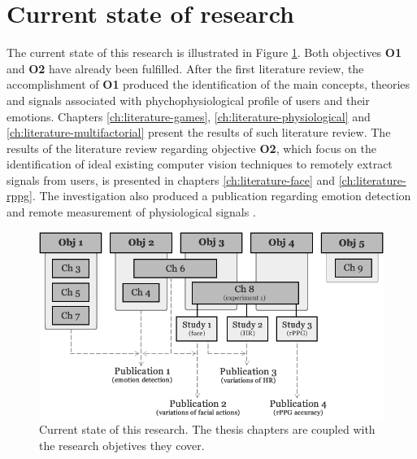 
\section{Current state of research}

The current state of this research is illustrated in Figure \ref{fig:research-current-state}. Both objectives \textbf{O1} and \textbf{O2} have already been fulfilled. After the first literature review, the accomplishment of \textbf{O1} produced the identification of the main concepts, theories and signals associated with phychophysiological profile of users and their emotions. Chapters \ref{ch:literature-games}, \ref{ch:literature-physiological} and \ref{ch:literature-multifactorial} present the results of such literature review. The results of the literature review regarding objective \textbf{O2}, which focus on the identification of ideal existing computer vision techniques to remotely extract signals from users, is presented in chapters \ref{ch:literature-face} and \ref{ch:literature-rppg}. The investigation also produced a publication regarding emotion detection and remote measurement of physiological signals \parencite{bevilacqua2015proposal}.

\begin{figure}[ht]
    \centering
    \includegraphics[width=\textwidth]{figures/research-current-state.png}
    \caption{Current state of this research. The thesis chapters are coupled with the research objetives they cover.}
    \label{fig:research-current-state}
\end{figure}

